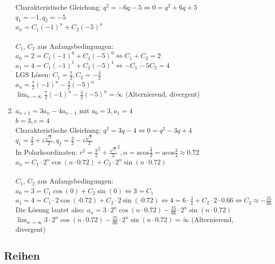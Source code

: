 \documentclass[11pt, a4paper]{article}
\newcommand{\acos}{\mathrm{acos}}
\begin{document}
\begin{enumerate}
		Charakteristische Gleichung: $q^2 = -6q -5 \Leftrightarrow 0 = q^2 + 6q + 5$ \\
		$q_1=-1, q_2=-5$ \\
		$a_n = C_1 (-1)^n + C_2 (-5)^n$ \\ \\
		$C_1$, $C_2$ aus Anfangsbedingungen: \\
		$a_0 = 2 = C_1 (-1)^0 + C_2 (-5)^0 \Leftrightarrow C_1 + C_2 = 2$ \\
		$a_1 = 4 = C_1 (-1)^1 + C_2 (-5)^1 \Leftrightarrow -C_1 -5C_2 = 4$ \\
		LGS Lösen: $C_1=\frac{7}{2}, C_2=-\frac{3}{2}$ \\
		$a_n = \frac{7}{2} (-1)^n - \frac{3}{2} (-5)^n$ \\
		$\lim_{n \rightarrow \infty} \frac{7}{2} (-1)^n - \frac{3}{2} (-5)^n = \tilde{\infty}$ (Alternierend, divergent)
	\item $a_{n+1} = 3 a_n - 4 a_{n-1}$ mit $a_0=3, a_1=4$ \\
		$b=3, c=4$ \\
		Charakteristische Gleichung: $q^2 = 3q - 4 \Leftrightarrow 0 = q^2 - 3q + 4$ \\
		$q_1=\frac{3}{2} + i \frac{\sqrt{7}}{2}, q_2=\frac{3}{2} - i \frac{\sqrt{7}}{2}$ \\
		In Polarkoordinaten: $r^2 = \frac{3}{2}^2 + \frac{\sqrt{7}}{2}^2, \alpha = \acos \frac{\frac{3}{2}}{2} = \acos \frac{3}{4} \approx 0.72$ \\
		$a_n = C_1 \cdot 2^n \cos(n\cdot 0.72) + C_2 \cdot 2^n \sin(n \cdot 0.72)$ \\ \\
		$C_1$, $C_2$ aus Anfangsbedingungen: \\
		$a_0 = 3 = C_1 \cos(0) + C_2 \sin(0) \Leftrightarrow 3 = C_1$ \\
		$a_1 = 4 = C_1 \cdot 2 \cos(\cdot 0.72) + C_2 \cdot 2 \sin(\cdot 0.72) \Leftrightarrow 4 = 6 \cdot \frac{3}{4} + C_2 \cdot 2 \cdot 0.66 \Leftrightarrow C_2 \approx -\frac{25}{66}$ \\
		Die Lösung lautet also: $a_n = 3 \cdot 2^n \cos(n\cdot 0.72) -\frac{25}{66} \cdot 2^n \sin(n \cdot 0.72)$ \\
		$\lim_{n \rightarrow \infty} 3 \cdot 2^n \cos(n\cdot 0.72) -\frac{25}{66} \cdot 2^n \sin(n \cdot 0.72) = \tilde{\infty}$ (Alternierend, divergent)
\end{enumerate}

\subsection{Reihen}
\end{document}

